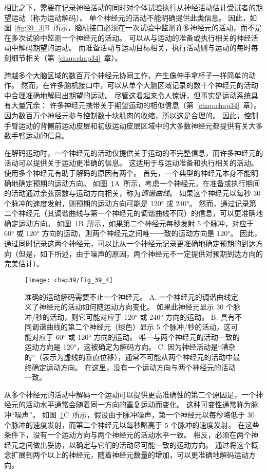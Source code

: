 相比之下，需要在记录神经活动的同时对个体试验执行从神经活动估计受试者的期望运动（称为运动解码）。
单个神经元的活动不能明确提供此类信息。
因此，如图~\ref{fig:39_3}B~所示，脑机接口必须在一次试验中监测许多神经元的活动，而不是在多次试验中监测一个神经元的活动。
可以从与运动的准备或执行相关的神经活动中解码期望的运动。
而准备活动与运动目标相关，执行活动则与运动的每时每刻细节相关（第~\ref{chap:chap34}~章）。


跨越多个大脑区域的数百万个神经元协同工作，产生像伸手拿杯子一样简单的动作。
然而，在许多脑机接口中，可以从单个大脑区域记录的数十个神经元的活动中合理准确地解码出期望的运动。
尽管这看起来令人惊讶，但事实是运动系统具有大量冗余：
许多神经元携带关于期望运动的相似信息（第~\ref{chap:chap34}~章）。
因为数百万个神经元参与控制数十块肌肉的收缩，所以这是合理的。
因此，控制手臂运动的背侧前运动皮层和初级运动皮层区域中的大多数神经元都提供有关大多数手臂运动的信息。


在解码运动时，一个神经元的活动仅提供关于运动的不完整信息，而许多神经元的活动可以提供关于运动更准确的信息。
这适用于与运动准备和执行相关的活动。
使用多个神经元有助于解码的原因有两个。
首先，一个典型的神经元本身不能明确地确定预期的运动方向。
如图~\ref{fig:39_4}A~所示，考虑一个神经元，在准备或执行期间的活动通过余弦函数与运动方向相关，称为\textit{调谐曲线}。
如果这个神经元以每秒 30 个脉冲的速度发射，则预期的运动方向可能是 120° 或 240°。
然而，通过记录第二个神经元（其调谐曲线与第一个神经元的调谐曲线不同）的信息，可以更准确地确定运动方向。
如图~\ref{fig:39_4}B~所示，如果第二个神经元每秒发射 5 个脉冲，对应于 60° 或 120° 方向的运动，则两个神经元之间唯一一致的运动方向是 120°。
因此，通过同时记录这两个神经元，可以比从一个神经元记录更准确地确定预期的到达方向（但是，如下所述，由于噪声的原因，两个神经元不一定提供对预期到达方向的完美估计）。


\begin{figure}[htbp]
	\centering
	\texttt{[image: chap39/fig\_39\_4]}
	\caption{准确的运动解码需要不止一个神经元。
		A. 一个神经元的调谐曲线定义了神经元的活动如何随运动方向变化。
		如果此神经元显示 30 个脉冲/秒的活动，则它可能对应于 120° 或 240° 方向的运动。 
		B. 具有不同调谐曲线的第二个神经元（绿色）显示 5 个脉冲/秒的活动，这可能对应于 60° 或 120° 方向的运动。
		唯一与两个神经元的活动一致的运动方向是 120°，这被确定为解码方向。
		C. 因为神经活动是“嘈杂的”（表示为虚线的垂直位移），通常不可能从两个神经元的活动中最终确定运动方向。
		在这里，没有一个运动方向与两个神经元的活动一致。}
	\label{fig:39_4}
\end{figure}


从多个神经元的活动中解码一个运动可以提供更高准确性的第二个原因是，一个神经元的活动水平通常会随着同一方向的重复运动而变化。
这种可变性通常称为脉冲“噪声”。
如图~\ref{fig:39_4}C~所示，假设由于脉冲噪声，第一个神经元以每秒略低于 30 个脉冲的速度发射，而第二个神经元以每秒略高于 5 个脉冲的速度发射。
在这些条件下，没有一个运动方向与两个神经元的活动水平一致。
相反，必须在两个神经元之间做出妥协，以确定与它们的活动尽可能一致的运动方向。
通过将这个概念扩展到两个以上的神经元，随着神经元数量的增加，可以更准确地解码运动方向。



